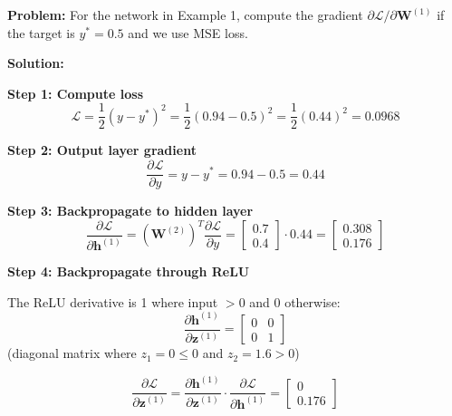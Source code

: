 \begin{examplebox}

\textbf{Problem:} For the network in Example 1, compute the gradient $\partial \mathcal{L}/\partial \mathbf{W}^{(1)}$ if the target is $y^* = 0.5$ and we use MSE loss.

\textbf{Solution:}

\textbf{Step 1: Compute loss}
\begin{equation}
\mathcal{L} = \frac{1}{2}(y - y^*)^2 = \frac{1}{2}(0.94 - 0.5)^2 = \frac{1}{2}(0.44)^2 = 0.0968
\end{equation}

\textbf{Step 2: Output layer gradient}
\begin{equation}
\frac{\partial \mathcal{L}}{\partial y} = y - y^* = 0.94 - 0.5 = 0.44
\end{equation}

\textbf{Step 3: Backpropagate to hidden layer}
\begin{equation}
\frac{\partial \mathcal{L}}{\partial \mathbf{h}^{(1)}} = \left(\mathbf{W}^{(2)}\right)^T \frac{\partial \mathcal{L}}{\partial y} = \begin{bmatrix} 0.7 \\ 0.4 \end{bmatrix} \cdot 0.44 = \begin{bmatrix} 0.308 \\ 0.176 \end{bmatrix}
\end{equation}

\textbf{Step 4: Backpropagate through ReLU}

The ReLU derivative is 1 where input $> 0$ and 0 otherwise:
\begin{equation}
\frac{\partial \mathbf{h}^{(1)}}{\partial \mathbf{z}^{(1)}} = \begin{bmatrix} 0 & 0 \\ 0 & 1 \end{bmatrix}
\end{equation}
(diagonal matrix where $z_1 = 0 \leq 0$ and $z_2 = 1.6 > 0$)

\begin{equation}
\frac{\partial \mathcal{L}}{\partial \mathbf{z}^{(1)}} = \frac{\partial \mathbf{h}^{(1)}}{\partial \mathbf{z}^{(1)}} \cdot \frac{\partial \mathcal{L}}{\partial \mathbf{h}^{(1)}} = \begin{bmatrix} 0 \\ 0.176 \end{bmatrix}
\end{equation}


\end{examplebox}
